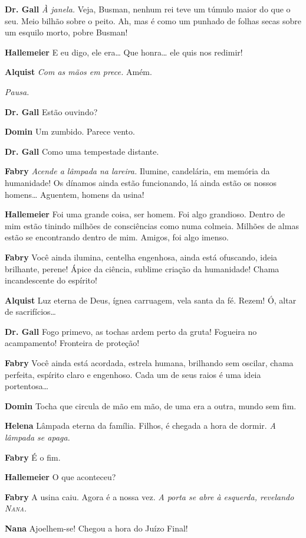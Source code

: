 \textbf{Dr. Gall} \emph{À janela.} Veja, Busman, nenhum rei teve um túmulo maior do
que o seu. Meio bilhão sobre o peito. Ah, mas é como um punhado de folhas secas
sobre um esquilo morto, pobre Busman!

\textbf{Hallemeier} E eu digo, ele era\ldots{} Que honra\ldots{} ele quis nos redimir!

\textbf{Alquist} \emph{Com as mãos em prece.} Amém.

\emph{Pausa.}

\textbf{Dr. Gall} Estão ouvindo?

\textbf{Domin} Um zumbido. Parece vento.

\textbf{Dr. Gall} Como uma tempestade distante.

\textbf{Fabry} \emph{Acende a lâmpada na lareira.} Ilumine, candelária, em memória da
humanidade! Os dínamos ainda estão funcionando, lá ainda estão os nossos homens\ldots{}
Aguentem, homens da usina!

\textbf{Hallemeier} Foi uma grande coisa, ser homem. Foi algo grandioso. Dentro de mim
estão tinindo milhões de consciências como numa colmeia. Milhões de almas estão
se encontrando dentro de mim. Amigos, foi algo imenso.

\textbf{Fabry} Você ainda ilumina, centelha engenhosa, ainda está ofuscando,
ideia brilhante, perene! Ápice da ciência, sublime criação da humanidade! Chama incandescente
do espírito!

\textbf{Alquist} Luz eterna de Deus, ígnea carruagem, vela santa da fé. Rezem! Ó,
altar de sacrifícios\ldots{}

\textbf{Dr. Gall} Fogo primevo, as tochas ardem perto da gruta! Fogueira no
acampamento! Fronteira de proteção!

\textbf{Fabry} Você ainda está acordada, estrela humana, brilhando sem oscilar, chama
perfeita, espírito claro e engenhoso. Cada um de seus raios é uma ideia portentosa\ldots{}

\textbf{Domin} Tocha que circula de mão em mão, de uma era a outra, mundo sem fim.

\textbf{Helena} Lâmpada eterna da família. Filhos, é chegada a hora de dormir.
\emph{A lâmpada se apaga.}

\textbf{Fabry} É o fim.

\textbf{Hallemeier} O que aconteceu?

\textbf{Fabry} A usina caiu. Agora é a nossa vez.
\emph{A porta se abre à esquerda, revelando \textsc{Nana}.}

\textbf{Nana} Ajoelhem-se! Chegou a hora do Juízo Final!

